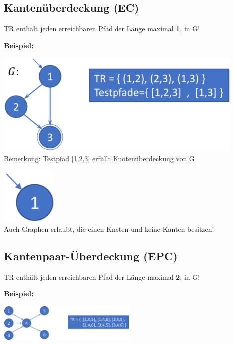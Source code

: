\documentclass[11pt, a4paper]{article}
\begin{document}
\subsection{Kantenüberdeckung (EC)}

TR enthält jeden erreichbaren Pfad der Länge maximal \textbf{1}, in G!

\vspace{1em}
\textbf{Beispiel:}

\begin{minipage}[h]{0.45\textwidth}
    \centering \includegraphics[width=0.9\textwidth]{Graphen-02.png} \\
    Bemerkung: Testpfad [1,2,3] erfüllt Knotenüberdeckung von G
\end{minipage}
\begin{minipage}[h]{0.45\textwidth}
    \centering \includegraphics[width=0.2\textwidth]{Graphen-03.png} \\
    Auch Graphen erlaubt, die einen Knoten und keine Kanten besitzen!
\end{minipage}


\subsection{Kantenpaar-Überdeckung (EPC)}

TR enthält jeden erreichbaren Pfad der Länge maximal \textbf{2}, in G!

\vspace{1em}
\textbf{Beispiel:}

\includegraphics[width=0.5\textwidth]{Graphen-04.png} \raggedright
\end{document}
